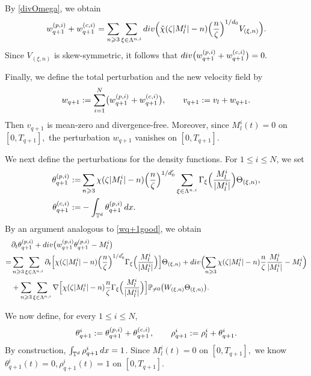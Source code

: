 \documentclass[10pt,a4paper]{amsart}
\numberwithin{equation}{section}
\def\dif{{\mathord{{\rm d}}}}
\def\geq{\geqslant}
\def\leq{\leqslant}
\def\div{\mathord{{\rm div}}}
\def\dif{{\mathord{{\rm d}}}}
\def\geq{\geqslant}
\def\leq{\leqslant}
\def\div{\mathord{{\rm div}}}
\begin{document}
By \eqref{divOmega}, we obtain
\begin{align}
w_{q+1}^{(p,i)}
+
w_{q+1}^{(c,i)}
=
\sum_{n\geq3}
\sum_{\xi\in\Lambda^{n,i}}
\div\Bigl(
\tilde{\chi}(\zeta|M_l^i|-n)
\Bigl(\frac{n}{\zeta}\Bigr)^{1/d_0}
V_{(\xi,n)}
\Bigr).
\label{eq:6wq+1p+wq+1c}
\end{align}
Since $V_{(\xi,n)}$ is skew-symmetric, it follows that
$
\div\bigl(
w_{q+1}^{(p,i)}
+
w_{q+1}^{(c,i)}
\bigr)=0.
$

Finally, we define the total perturbation and the new velocity field by
\begin{align}
w_{q+1}
:=
\sum_{i=1}^{N}
\bigl(
w_{q+1}^{(p,i)}
+
w_{q+1}^{(c,i)}
\bigr),
\qquad
v_{q+1}
:=
v_l+w_{q+1}.
\notag
\end{align}
Then $v_{q+1}$ is mean-zero and divergence-free.
Moreover, since $M_l^i(t)=0$ on $[0,T_{q+1}],$ the perturbation $w_{q+1}$  vanishes  on $[0,T_{q+1}]$. 
 
We next define the perturbations for the density functions. 
For $1\leq i\leq N$, we set
\begin{align}
\theta_{q+1}^{(p,i)}
:=
&\sum_{n\geq3}
\chi(\zeta|M_l^i|-n)
\Bigl(\frac{n}{\zeta}\Bigr)^{1/d_0'}
\sum_{\xi\in\Lambda^{n,i}}
\Gamma_\xi\Bigl(\frac{M_l^i}{|M_l^i|}\Bigr)
\Theta_{(\xi,n)}
,
\notag\\
\theta_{q+1}^{(c,i)}
:=
&-
\int_{\mathbb{T}^d}
\theta_{q+1}^{(p,i)}\,\dif x.
\notag
\end{align}
By an argument analogous to \eqref{wq+1good}, we obtain
\begin{align}
&
\partial_t\theta_{q+1}^{(p,i)}
+
\div\bigl(
w_{q+1}^{(p,i)}
\theta_{q+1}^{(p,i)}
-
M_l^i
\bigr)
\notag\\
=
&
\sum_{n\geq3}
\sum_{\xi\in\Lambda^{n,i}}
\partial_t
\Bigl[
\chi(\zeta|M_l^i|-n)
\Bigl(\frac{n}{\zeta}\Bigr)^{1/d_0'}
\Gamma_\xi\Bigl(\frac{M_l^i}{|M_l^i|}\Bigr)
\Bigr]
\Theta_{(\xi,n)}+
\div
\Bigl(
\sum_{n\geq3}
\chi(\zeta|M_l^i|-n)
\frac{n}{\zeta}
\frac{M_l^i}{|M_l^i|}
-
M_l^i
\Bigr)
\notag\\
&+
\sum_{n\geq3}
\sum_{\xi\in\Lambda^{n,i}}
\nabla
\Bigl[
\chi(\zeta|M_l^i|-n)
\frac{n}{\zeta}
\Gamma_\xi\Bigl(\frac{M_l^i}{|M_l^i|}\Bigr)
\Bigr]
\mathbb{P}_{\neq0}
\bigl(
W_{(\xi,n)}
\Theta_{(\xi,n)}
\bigr).
\label{6wq+1good}
\end{align}

We now define, for every $1\leq i\leq N$,
\begin{align}
\theta_{q+1}^i
:=
\theta_{q+1}^{(p,i)}
+
\theta_{q+1}^{(c,i)}
,
\qquad
\rho_{q+1}^i
:=
\rho_l^i+\theta_{q+1}^i.
\notag
\end{align}
By construction,
$
\int_{\mathbb{T}^d}\rho_{q+1}^i\,\dif x=1
$.
Since
$
M_l^i(t)=0
$
on
$
[0,T_{q+1}],
$
we know $\theta_{q+1}^i(t)=0,\rho_{q+1}^i(t)=1
$
on
$
[0,T_{q+1}]
$.  
 
\end{document}
